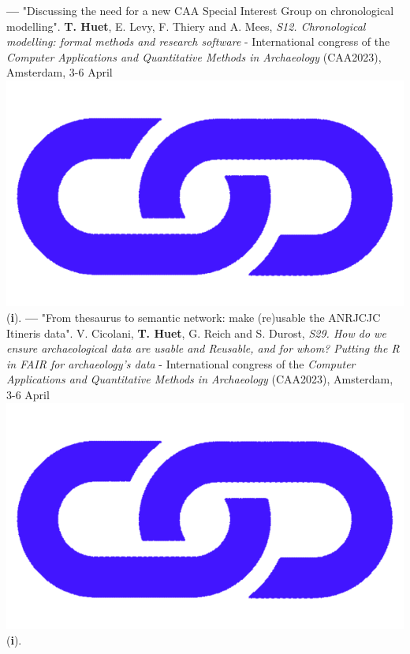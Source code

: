 \documentclass{article}
\begin{document}
\smallbreak
\textbf{--- }"Discussing the need for a new CAA Special Interest Group on chronological modelling". \textbf{T. Huet}, E. Levy, F. Thiery and A. Mees, \textit{S12. Chronological modelling: formal methods and research software} - International congress of the \textit{Computer Applications and Quantitative Methods in Archaeology} (CAA2023), Amsterdam, 3-6 April \href{https://historical-time.github.io/caa23/sig/pres}{\includegraphics[scale=0.02]{link_darkblue.png}} (\textbf{i}).
\smallbreak
\textbf{--- }"From thesaurus to semantic network: make (re)usable the ANRJCJC Itineris data". V. Cicolani, \textbf{T. Huet}, G. Reich and S. Durost, \textit{S29. How do we ensure archaeological data are usable and Reusable, and for whom? Putting the R in FAIR for archaeology's data} - International congress of the \textit{Computer Applications and Quantitative Methods in Archaeology} (CAA2023), Amsterdam, 3-6 April \href{https://anr-itineris.github.io/itineris/talk/caa-2023/thesaurus/pres/#/title-slide}{\includegraphics[scale=0.02]{link_darkblue.png}} (\textbf{i}).
\smallbreak
\end{document}
